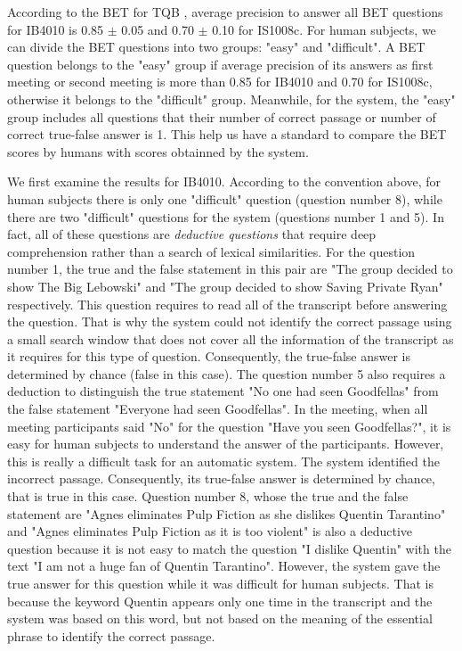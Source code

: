 

According to the BET for TQB \cite{popescubelis2007otm}, average precision to answer all BET questions for IB4010 is 0.85 \ensuremath{\pm} 0.05 and 0.70 \ensuremath{\pm} 0.10 for IS1008c. For human subjects, we can divide the BET questions into two groups: "easy" and "difficult". A BET question belongs to the "easy" group  if average precision of its answers as first meeting or second meeting is more than 0.85 for IB4010 and 0.70 for IS1008c, otherwise it belongs to the "difficult" group. Meanwhile, for the system, the "easy" group includes all questions that  their number of correct passage or number of correct true-false answer is 1.
This help us have a standard to compare the BET scores by humans with scores obtainned by the system.

We first examine the results for IB4010. According to the convention above, for human subjects there is only one "difficult" question (question number 8), while there are two "difficult" questions for the system (questions number 1 and 5). In fact, all of these questions are \textit{deductive questions} that require deep comprehension rather than a search of lexical similarities. For the question number 1, the true and the false statement in this pair are "The group decided to show The Big Lebowski" and "The group decided to show Saving Private Ryan" respectively. This question requires to read all of the transcript before answering the question. That is why the system could not identify the correct passage using a small search window that does not cover all the information of the transcript as it requires for this type of question. Consequently, the true-false answer is determined by chance (false in this case). The question number 5 also requires a deduction to distinguish the true statement "No one had seen Goodfellas" from the false statement "Everyone  had seen Goodfellas". In the meeting, when all meeting participants said "No" for the question "Have you seen Goodfellas?", it is easy for human subjects to understand the answer of the participants. However, this is really a difficult task for an automatic system.  The system identified the incorrect passage. Consequently, its true-false answer is determined by chance, that is true in this case. Question number 8, whose the true and the false statement are "Agnes eliminates Pulp Fiction as she dislikes Quentin Tarantino" and "Agnes eliminates Pulp Fiction as it is too violent" is also a deductive question because it is not easy to match the question "I dislike Quentin" with the text "I am not a huge fan of Quentin Tarantino". However, the system gave the true answer for this question while it was difficult for human subjects. That is because the keyword Quentin appears only one time in the transcript and the system was based on this word, but not based on the meaning of the essential phrase to identify the correct passage.

